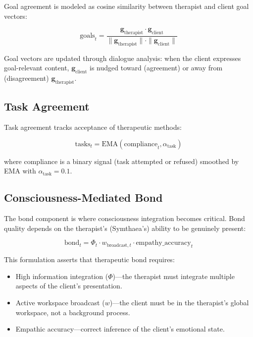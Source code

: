 \documentclass[11pt,a4paper]{article}
\begin{document}
Goal agreement is modeled as cosine similarity between therapist and client goal vectors:

\begin{equation}
\text{goals}_t = \frac{\mathbf{g}_{\text{therapist}} \cdot \mathbf{g}_{\text{client}}}{\|\mathbf{g}_{\text{therapist}}\| \cdot \|\mathbf{g}_{\text{client}}\|}
\end{equation}

Goal vectors are updated through dialogue analysis: when the client expresses goal-relevant content, $\mathbf{g}_{\text{client}}$ is nudged toward (agreement) or away from (disagreement) $\mathbf{g}_{\text{therapist}}$.

\subsection{Task Agreement}

Task agreement tracks acceptance of therapeutic methods:

\begin{equation}
\text{tasks}_t = \text{EMA}(\text{compliance}_t, \alpha_{\text{task}})
\end{equation}

where compliance is a binary signal (task attempted or refused) smoothed by EMA with $\alpha_{\text{task}} = 0.1$.

\subsection{Consciousness-Mediated Bond}

The bond component is where consciousness integration becomes critical. Bond quality depends on the therapist's (Symthaea's) ability to be genuinely present:

\begin{equation}
\text{bond}_t = \Phi_t \cdot w_{\text{broadcast},t} \cdot \text{empathy\_accuracy}_t
\end{equation}

This formulation asserts that therapeutic bond requires:
\begin{itemize}[nosep]
    \item High information integration ($\Phi$)---the therapist must integrate multiple aspects of the client's presentation.
    \item Active workspace broadcast ($w$)---the client must be in the therapist's global workspace, not a background process.
    \item Empathic accuracy---correct inference of the client's emotional state.
\end{itemize}
\end{document}
